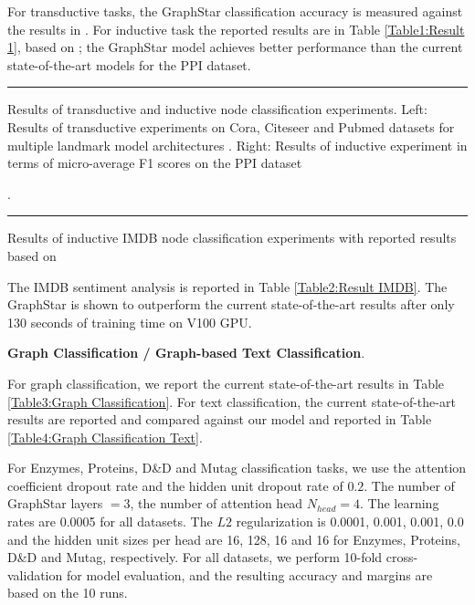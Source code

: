 \documentclass{article}
\begin{document}
For transductive tasks, the GraphStar classification accuracy is measured against the results in \cite{gao2018large,velivckovic2017graph,DBLP:journals/corr/abs-1902-07153,DBLP:journals/corr/abs-1811-02798,zhang2018gaan}. For inductive task the reported results are in Table \ref{Table1:Result 1}, based on \cite{gao2018large, hamilton2017inductive,velivckovic2017graph,xu2018representation}; the GraphStar model achieves better performance than the current state-of-the-art models for the PPI dataset.

\begin{table}[!ht]
\centering
{}
\rule{\linewidth}{0cm}
\caption{\label{Table1:Result 1} Results of transductive and inductive node classification experiments. Left: Results of transductive experiments on Cora, Citeseer and Pubmed datasets for multiple landmark model architectures \cite{gao2018large,velivckovic2017graph,DBLP:journals/corr/abs-1902-07153,DBLP:journals/corr/abs-1811-02798,zhang2018gaan}. Right: Results of inductive experiment in terms of micro-average F1 scores on the PPI dataset \cite{gao2018large, hamilton2017inductive,velivckovic2017graph,xu2018representation}}.
\end{table}
\vspace*{-\baselineskip}
\begin{table}[!ht]
\centering
{}
\rule{\linewidth}{0cm}
\caption{\label{Table2:Result IMDB} Results of inductive IMDB node classification experiments with reported results based on \cite{johnson2016supervised,sachan2018revisiting,2019arXiv190412848X}}
\end{table}

The IMDB sentiment analysis is reported in Table \ref{Table2:Result IMDB}. The GraphStar is shown to outperform the current state-of-the-art results after only 130 seconds of training time on V100 GPU.

\textbf{Graph Classification / Graph-based Text Classification}. 

For graph classification, we report the current state-of-the-art results in Table \ref{Table3:Graph Classification}. For text classification, the current state-of-the-art results are reported and compared against our model\cite{verma2018graph,ying2018hierarchical,li2019semi} and reported in Table \ref{Table4:Graph Classification Text}.

For Enzymes, Proteins, D\&D and Mutag classification tasks, we use the attention coefficient dropout rate and the hidden unit dropout rate of \(0.2\). The number of GraphStar layers \(=3\), the number of attention head \(N_{head}=4\). The learning rates are 0.0005 for all datasets. The \(L2\) regularization is 0.0001, 0.001, 0.001, 0.0 and the hidden unit sizes per head are 16, 128, 16 and 16 for Enzymes, Proteins, D\&D and Mutag, respectively. For all datasets, we perform 10-fold cross-validation for model evaluation, and the resulting accuracy and margins are based on the 10 runs.
\end{document}
